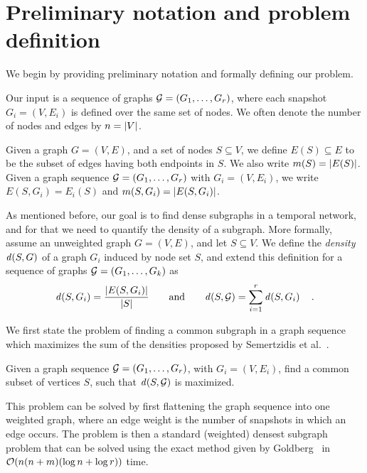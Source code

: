 \section{Preliminary notation and problem definition}\label{sec:prel}

We begin by providing preliminary notation and formally defining our problem.

Our input is a sequence of graphs ${\mathcal G} = (G_1, \ldots, G_r)$, where each snapshot $G_i = (V, E_i)$
is defined over the same set of nodes. We often denote the number of nodes and edges by $n = {\left|V\right|}$. %

Given a graph $G = (V, E)$, and a set of nodes $S \subseteq V$, we define $E(S) \subseteq E$ to be the subset of edges
having both endpoints in $S$. We also write $m(S) = {\left|E(S)\right|}$. Given a  graph sequence ${\mathcal G} = (G_1, \ldots, G_r)$ with $G_i = (V, E_i)$, we write $E(S, G_i) = E_i(S)$ and $m(S, G_i) = {\left|E(S, G_i)\right|}$.

As mentioned before, our goal is to find dense subgraphs in a temporal network, and for that
we need to quantify the density of a subgraph. More formally,
assume an unweighted graph $G = (V, E)$, and let $S \subseteq V$.
We define the \emph{density} $\dens{S, G}$ of a graph $G_i$ induced by node set $S$,
and extend this definition for a sequence of graphs ${\mathcal G} = (G_1, \ldots, G_k)$
as
\[
	\dens{S, G_i} = \frac{\abs{E(S, G_i)}}{\abs{S}}
	\quad\quad \text{and}\quad\quad
	\dens{S, \calG} = \sum_{i = 1}^r \dens{S, G_i}
	\quad.
\]


We first state the problem of finding a common subgraph in a graph sequence which maximizes the sum of the densities proposed by Semertzidis et al.~\cite{semertzidis2019finding}.

\begin{problem}
\label{pr:dts}
Given a graph sequence ${\mathcal G} = (G_1,\dots,G_r)$, with  $G_i = (V, E_i)$, find a common subset of vertices
$S$, 
such that $\dens{S, \calG}$ is maximized.
\end{problem}

This problem can be solved by first flattening the graph sequence into one weighted graph, where an edge weight is the number of snapshots in which an edge occurs.
The problem is then a standard (weighted) densest subgraph problem that can be solved
using the exact method given by Goldberg~\cite{goldberg1984finding} in $\bigO{n(n + m) (\log n + \log r)}$ time.



